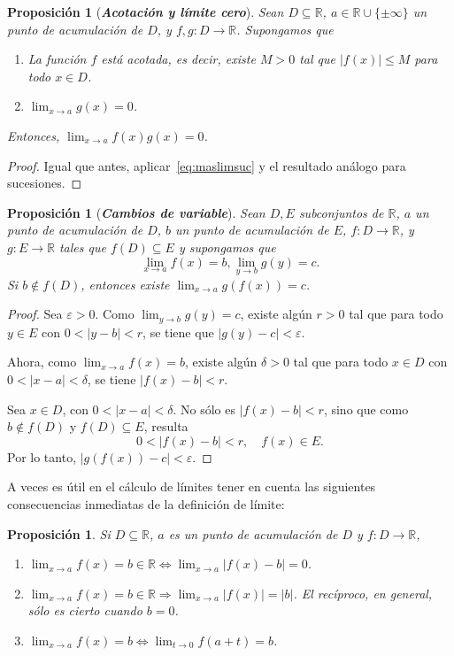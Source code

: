 \documentclass[12pt]{article}
\newtheorem{proposition}[theorem]{Proposición}
\begin{document}
\begin{proposition}[\textbf{\textit{Acotación y límite cero}}]
Sean $D \subseteq \mathbb{R}$, $a \in \mathbb{R} \cup \lbrace \pm \infty	 \rbrace$ un punto de acumulación de $D$, y $f, g \colon D \longrightarrow \mathbb{R}$. Supongamos que 
\begin{enumerate}
\item La función $f$ está acotada, es decir, existe $M >0$ tal que $|f(x)| \leq M$ para todo $x \in D$.
\item $\lim_{x  \rightarrow a} g(x) = 0$. 
\end{enumerate}
Entonces, $\lim_{x \rightarrow a} f(x)g(x) = 0$.
\end{proposition}
\begin{proof}
Igual que antes, aplicar~\ref{eq:maslimsuc} y el resultado análogo para sucesiones.

\end{proof}

\begin{proposition}[\textbf{\textit{Cambios de variable}}]Sean $D, E$ subconjuntos de $\mathbb{R}$, $a$ un punto de acumulación de $D$, $b$ un punto de acumulación de $E$, $f \colon D \longrightarrow \mathbb{R}$, y $g \colon E \longrightarrow \mathbb{R}$ tales que $f(D) \subseteq E$ y supongamos que $$\lim_{x \rightarrow a} f(x) = b, \lim_{y \rightarrow b} g(y) = c.$$ Si $b \notin f(D)$, entonces existe $\lim_{x \rightarrow a} g(f(x)) = c$.
\end{proposition}
\begin{proof}
Sea $\varepsilon >0$. Como $\lim_{y \rightarrow b } g(y) = c$, existe algún $r >0$ tal que para todo $y \in E$ con $0 < |y-b |<r$, se tiene que $|g(y) -c | < \varepsilon$. 

Ahora, como $\lim_{x \rightarrow a} f(x) = b$, existe algún $\delta >0$ tal que para todo $x \in D$ con $0 < |x-a| < \delta$, se tiene $ |f(x) - b | < r$.

Sea $x \in D$, con $0 < |x-a| < \delta$. No sólo es $|f(x)-b| < r$, sino que como $b  \notin f(D)$ y $f(D) \subseteq E$, resulta $$0 < |f(x) -b | < r, \quad f(x) \in E.$$ Por lo tanto, $|g(f(x)) -c| < \varepsilon$.

\end{proof}

A veces es útil en el cálculo de límites tener en cuenta las siguientes consecuencias inmediatas de la definición de límite: 

\begin{proposition}Si $D \subseteq \mathbb{R}$, $a$ es un punto de acumulación de $D$ y $f \colon D \longrightarrow \mathbb{R}$, 
\begin{enumerate}
\item $\lim_{x\rightarrow a} f(x) = b \in \mathbb{R} \Longleftrightarrow \lim_{x \rightarrow a} |f(x) -b | = 0$.
\item $\lim_{x \rightarrow a} f(x) = b \in \mathbb{R} \Longrightarrow \lim_{x \rightarrow a} |f(x) | = |b|$. El recíproco, en general, sólo es cierto cuando $b= 0$.
\item $\lim_{x \rightarrow a} f(x) = b \Longleftrightarrow \lim_{t \rightarrow 0} f(a+t) = b$.
\end{enumerate}
\end{proposition}
\end{document}
